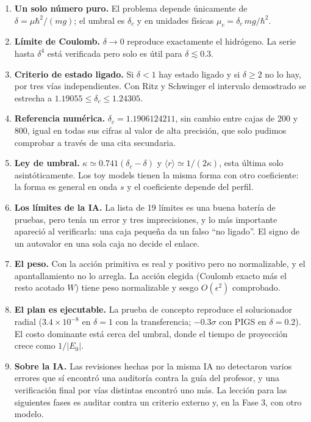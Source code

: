 \documentclass[11pt]{article}
\newcommand{\dc}{\delta_c}
\begin{document}
\begin{enumerate}
\item \textbf{Un solo número puro.} El problema depende únicamente de $\delta=\mu\hbar^2/(mg)$; el umbral es $\dc$ y en unidades físicas $\mu_c=\dc\,mg/\hbar^2$.
\item \textbf{Límite de Coulomb.} $\delta\to0$ reproduce exactamente el hidrógeno. La serie hasta $\delta^4$ está verificada pero solo es útil para $\delta\lesssim0.3$.
\item \textbf{Criterio de estado ligado.} Si $\delta<1$ hay estado ligado y si $\delta\ge2$ no lo hay, por tres vías independientes. Con Ritz y Schwinger el intervalo demostrado se estrecha a $1.19055\le\dc\le1.24305$.
\item \textbf{Referencia numérica.} $\dc=1.1906124211$, sin cambio entre cajas de 200 y 800, igual en todas sus cifras al valor de alta precisión, que solo pudimos comprobar a través de una cita secundaria.
\item \textbf{Ley de umbral.} $\kappa\simeq0.741(\dc-\delta)$ y $\langle r\rangle\simeq1/(2\kappa)$, esta última solo asintóticamente. Los toy models tienen la misma forma con otro coeficiente: la forma es general en onda $s$ y el coeficiente depende del perfil.
\item \textbf{Los límites de la IA.} La lista de 19 límites es una buena batería de pruebas, pero tenía un error y tres imprecisiones, y lo más importante apareció al verificarla: una caja pequeña da un falso ``no ligado''. El signo de un autovalor en una sola caja no decide el enlace.
\item \textbf{El peso.} Con la acción primitiva es real y positivo pero no normalizable, y el apantallamiento no lo arregla. La acción elegida (Coulomb exacto más el resto acotado $W$) tiene peso normalizable y sesgo $O(\epsilon^2)$ comprobado.
\item \textbf{El plan es ejecutable.} La prueba de concepto reproduce el solucionador radial ($3.4\times10^{-8}$ en $\delta=1$ con la transferencia; $-0.3\sigma$ con PIGS en $\delta=0.2$). El costo dominante está cerca del umbral, donde el tiempo de proyección crece como $1/|E_0|$.
\item \textbf{Sobre la IA.} Las revisiones hechas por la misma IA no detectaron varios errores que sí encontró una auditoría contra la guía del profesor, y una verificación final por vías distintas encontró uno más. La lección para las siguientes fases es auditar contra un criterio externo y, en la Fase 3, con otro modelo.
\end{enumerate}
\end{document}
